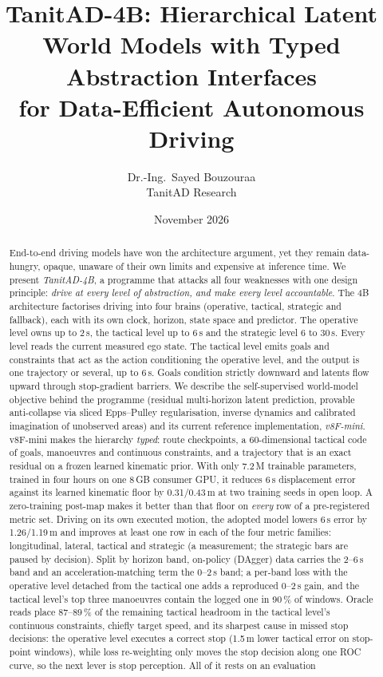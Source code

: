\documentclass[10pt,twocolumn]{article}
\title{\vspace{-6mm}\textbf{TanitAD-4B: Hierarchical Latent World Models with Typed Abstraction Interfaces\\for Data-Efficient Autonomous Driving}}
\author{Dr.-Ing.\ Sayed Bouzouraa\\[1mm]\normalsize TanitAD Research}
\date{November 2026}
\theoremstyle{remark}
\begin{document}
\maketitle

\begin{abstract}
End-to-end driving models have won the architecture argument, yet they remain data-hungry, opaque, unaware of their own limits and
expensive at inference time. We present \emph{TanitAD-4B}, a programme that attacks all four weaknesses with one design principle:
\emph{drive at every level of abstraction, and make every level accountable}. The 4B architecture factorises driving into four
brains (operative, tactical, strategic and fallback), each with its own clock, horizon, state space and predictor. The operative
level owns up to 2\,s, the tactical level up to 6\,s and the strategic level 6 to 30\,s. Every level reads the current measured ego state.
The tactical level emits goals and constraints that act as the action conditioning the operative level, and the output is one
trajectory or several, up to 6\,s. Goals condition strictly downward and latents flow upward through stop-gradient barriers. We describe the self-supervised world-model objective
behind the programme (residual multi-horizon latent prediction, provable anti-collapse via sliced Epps--Pulley regularisation,
inverse dynamics and calibrated imagination of unobserved areas) and its current reference implementation, \emph{v8F-mini}.
v8F-mini makes the hierarchy \emph{typed}: route checkpoints, a 60-dimensional tactical code of goals, manoeuvres and continuous
constraints, and a trajectory that is an exact residual on a frozen learned kinematic prior. With only 7.2\,M trainable parameters,
trained in four hours on one 8\,GB consumer GPU, it reduces 6\,s displacement error against its learned kinematic floor by
0.31/0.43\,m at two training seeds in open loop. A zero-training post-map makes it better than that floor on \emph{every} row of a
pre-registered metric set. Driving on its own executed motion, the adopted model lowers 6\,s error by 1.26/1.19\,m and improves at
least one row in each of the four metric families: longitudinal, lateral, tactical and strategic (a measurement; the strategic bars are paused by decision). Split by horizon band, on-policy (DAgger) data carries the 2--6\,s band and an acceleration-matching term the 0--2\,s band; a per-band loss with the operative level detached from the tactical one adds a reproduced 0--2\,s gain, and the tactical level's top three manoeuvres contain the logged one in 90\,\% of windows. Oracle reads place 87--89\,\% of the remaining tactical headroom in the tactical level's continuous constraints, chiefly target speed, and its sharpest cause in missed stop decisions: the operative level executes a correct stop (1.5\,m lower tactical error on stop-point windows), while loss re-weighting only moves the stop decision along one ROC curve, so the next lever is stop perception. All of it rests on an evaluation

\end{abstract}
\end{document}
